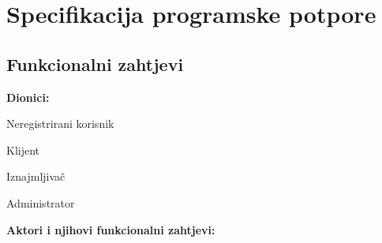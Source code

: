 \chapter{Specifikacija programske potpore}
		
	\section{Funkcionalni zahtjevi}
			
			
			
			\noindent \textbf{Dionici:}
			
			\begin{packed_enum}
				
				\item Neregistrirani korisnik
				\item Klijent				
				\item Iznajmljivač
				\item Administrator

				
			\end{packed_enum}
			
			\noindent \textbf{Aktori i njihovi funkcionalni zahtjevi:}
			


